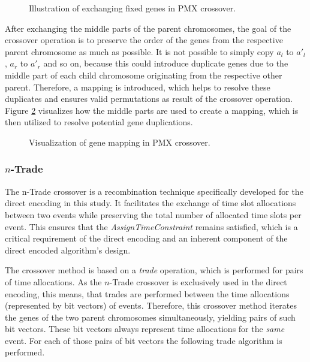 \documentclass[english,examples]{isasthesis}
\begin{document}
\begin{figure}[]
    \centering
    

    \caption{Illustration of exchanging fixed genes in PMX crossover.}
    \label{fig:pmx_middle_part_crossover}
\end{figure}

After exchanging the middle parts of the parent chromosomes, the goal of
the crossover operation is to preserve the order of the genes from the
respective parent chromosome as much as possible. It is not possible to simply
copy $a_l$ to $a'_l$, $a_r$ to $a'_r$ and so on, because this could introduce
duplicate genes due to the middle part of each child chromosome originating
from the respective other parent. Therefore, a mapping is introduced, which
helps to resolve these duplicates and ensures valid permutations as result of
the crossover operation. Figure \ref{fig:pmx_mapping} visualizes how the
middle parts are used to create a mapping, which is then utilized to resolve
potential gene duplications.

\begin{figure}[]
    \centering
    

    \caption{Visualization of gene mapping in PMX crossover.}
    \label{fig:pmx_mapping}
\end{figure}

\subsubsection{$n$-Trade}
\label{n-trade crossover}
The n-Trade crossover is a recombination technique specifically developed
for the direct encoding in this study. It facilitates the exchange of time slot
allocations between two events while preserving the total number of allocated
time slots per event. This ensures that the \textit{AssignTimeConstraint}
remains satisfied, which is a critical requirement of the direct encoding and
an inherent component of the direct encoded algorithm's design.

The crossover method is based on a \textit{trade} operation, which is performed
for pairs of time allocations. As the $n$-Trade crossover is exclusively used
in the direct encoding, this means, that trades are performed between the
time allocations (represented by bit vectors) of events. Therefore, this
crossover method iterates the genes of the two parent chromosomes
simultaneously, yielding pairs of such bit vectors. These bit vectors always
represent time allocations for the \textit{same} event. For each of those pairs
of bit vectors the following trade algorithm is performed.
\end{document}
